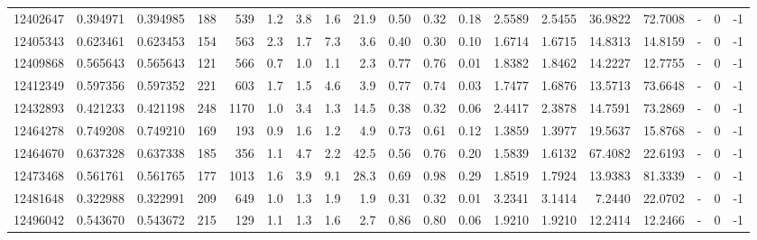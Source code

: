 \begin{tabular}{rrrrrrrrrrrrrrrrlrr}
  12402647 & 0.394971 &   0.394985 &  188 &  539 &      1.2 &      3.8 &     1.6 &     21.9 &       0.50 &        0.32 &        0.18 &  2.5589 &  2.5455 &   36.9822 &   72.7008 &             - &        0 &         -1 \\
  12405343 & 0.623461 &   0.623453 &  154 &  563 &      2.3 &      1.7 &     7.3 &      3.6 &       0.40 &        0.30 &        0.10 &  1.6714 &  1.6715 &   14.8313 &   14.8159 &             - &        0 &         -1 \\
  12409868 & 0.565643 &   0.565643 &  121 &  566 &      0.7 &      1.0 &     1.1 &      2.3 &       0.77 &        0.76 &        0.01 &  1.8382 &  1.8462 &   14.2227 &   12.7755 &             - &        0 &         -1 \\
  12412349 & 0.597356 &   0.597352 &  221 &  603 &      1.7 &      1.5 &     4.6 &      3.9 &       0.77 &        0.74 &        0.03 &  1.7477 &  1.6876 &   13.5713 &   73.6648 &             - &        0 &         -1 \\
  12432893 & 0.421233 &   0.421198 &  248 & 1170 &      1.0 &      3.4 &     1.3 &     14.5 &       0.38 &        0.32 &        0.06 &  2.4417 &  2.3878 &   14.7591 &   73.2869 &             - &        0 &         -1 \\
  12464278 & 0.749208 &   0.749210 &  169 &  193 &      0.9 &      1.6 &     1.2 &      4.9 &       0.73 &        0.61 &        0.12 &  1.3859 &  1.3977 &   19.5637 &   15.8768 &             - &        0 &         -1 \\
  12464670 & 0.637328 &   0.637338 &  185 &  356 &      1.1 &      4.7 &     2.2 &     42.5 &       0.56 &        0.76 &        0.20 &  1.5839 &  1.6132 &   67.4082 &   22.6193 &             - &        0 &         -1 \\
  12473468 & 0.561761 &   0.561765 &  177 & 1013 &      1.6 &      3.9 &     9.1 &     28.3 &       0.69 &        0.98 &        0.29 &  1.8519 &  1.7924 &   13.9383 &   81.3339 &             - &        0 &         -1 \\
  12481648 & 0.322988 &   0.322991 &  209 &  649 &      1.0 &      1.3 &     1.9 &      1.9 &       0.31 &        0.32 &        0.01 &  3.2341 &  3.1414 &    7.2440 &   22.0702 &             - &        0 &         -1 \\
  12496042 & 0.543670 &   0.543672 &  215 &  129 &      1.1 &      1.3 &     1.6 &      2.7 &       0.86 &        0.80 &        0.06 &  1.9210 &  1.9210 &   12.2414 &   12.2466 &             - &        0 &         -1 \\

\end{tabular}
